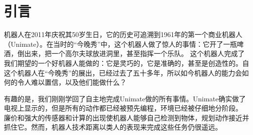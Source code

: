 \chapter{引言}\label{chap:introduction}

机器人在2011年庆祝其50岁生日，它的历史可追溯到1961年的第一个商业机器人（Unimate）。在当时的“今晚秀”中，这个机器人做了惊人的事情：它开了一瓶啤酒，倒出来，把一个高尔夫球放进洞里，甚至指挥一个乐队。 这个机器人完成了我们期望的一个好机器人能做的：它是灵巧的，它是准确的，甚至是创造性的。自这个机器人在“今晚秀”的展出，已经过去了五十多年，所以如今机器人的能力会如何的令人难以置信，以及他们能做什么？


有趣的是，我们刚刚学回了自主地完成Unimate做的所有事情。Unimate确实做了电视上显示的，但是所有的动作都已经被预先编程，环境已经被仔细地分阶段。 廉价和强大的传感器和计算的出现使机器人能够自己检测到物体，规划动作接近并抓住它。然而，机器人技术距离以类人的表现来完成这些任务仍很遥远。


